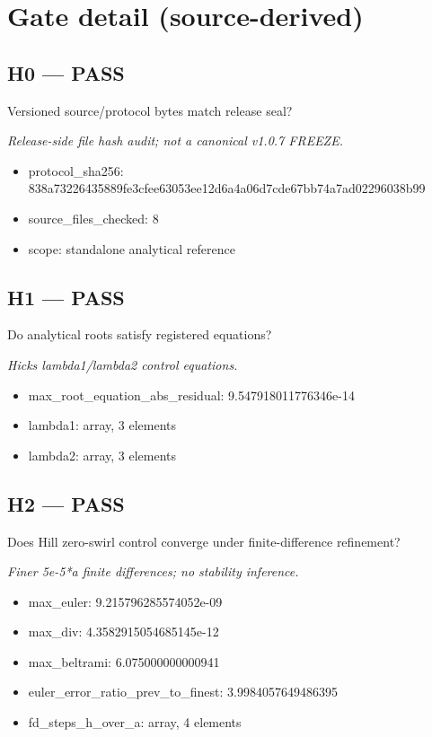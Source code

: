 \documentclass[10pt,a4paper]{article}
\begin{document}
\section*{Gate detail (source-derived)}
\subsection*{H0 --- PASS}
Versioned source/protocol bytes match release seal?
\par\textit{Release-side file hash audit; not a canonical v1.0.7 FREEZE.}\par
\begin{itemize}
\item protocol\_sha256: 838a73226435889fe3cfee63053ee12d6a4a06d7cde67bb74a7ad02296038b99
\item source\_files\_checked: 8
\item scope: standalone analytical reference
\end{itemize}
\subsection*{H1 --- PASS}
Do analytical roots satisfy registered equations?
\par\textit{Hicks lambda1/lambda2 control equations.}\par
\begin{itemize}
\item max\_root\_equation\_abs\_residual: 9.547918011776346e-14
\item lambda1: array, 3 elements
\item lambda2: array, 3 elements
\end{itemize}
\subsection*{H2 --- PASS}
Does Hill zero-swirl control converge under finite-difference refinement?
\par\textit{Finer 5e-5*a finite differences; no stability inference.}\par
\begin{itemize}
\item max\_euler: 9.215796285574052e-09
\item max\_div: 4.3582915054685145e-12
\item max\_beltrami: 6.075000000000941
\item euler\_error\_ratio\_prev\_to\_finest: 3.9984057649486395
\item fd\_steps\_h\_over\_a: array, 4 elements
\end{itemize}
\end{document}
